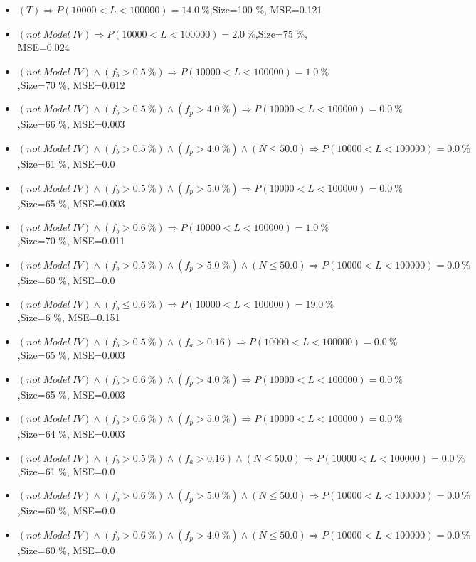\documentclass[numbered]{CSL}
\begin{document}
\begin{itemize}
\item $(T) \Rightarrow P(10 000 < L < 100 000) = 14.0~\%$,\hfill Size=100 \%, MSE=0.121
\item $(not~Model~IV) \Rightarrow P(10 000 < L < 100 000) = 2.0~\%$,\hfill Size=75 \%, MSE=0.024
\item $(not~Model~IV) \land (f_b > 0.5~\%) \Rightarrow P(10 000 < L < 100 000) = 1.0~\%$,\hfill Size=70 \%, MSE=0.012
\item $(not~Model~IV) \land (f_b > 0.5~\%) \land (f_p > 4.0~\%) \Rightarrow P(10 000 < L < 100 000) = 0.0~\%$,\hfill Size=66 \%, MSE=0.003
\item $(not~Model~IV) \land (f_b > 0.5~\%) \land (f_p > 4.0~\%) \land (N \leq 50.0) \Rightarrow P(10 000 < L < 100 000) = 0.0~\%$,\hfill Size=61 \%, MSE=0.0
\item $(not~Model~IV) \land (f_b > 0.5~\%) \land (f_p > 5.0~\%) \Rightarrow P(10 000 < L < 100 000) = 0.0~\%$,\hfill Size=65 \%, MSE=0.003
\item $(not~Model~IV) \land (f_b > 0.6~\%) \Rightarrow P(10 000 < L < 100 000) = 1.0~\%$,\hfill Size=70 \%, MSE=0.011
\item $(not~Model~IV) \land (f_b > 0.5~\%) \land (f_p > 5.0~\%) \land (N \leq 50.0) \Rightarrow P(10 000 < L < 100 000) = 0.0~\%$,\hfill Size=60 \%, MSE=0.0
\item $(not~Model~IV) \land (f_b \leq 0.6~\%) \Rightarrow P(10 000 < L < 100 000) = 19.0~\%$,\hfill Size=6 \%, MSE=0.151
\item $(not~Model~IV) \land (f_b > 0.5~\%) \land (f_a > 0.16) \Rightarrow P(10 000 < L < 100 000) = 0.0~\%$,\hfill Size=65 \%, MSE=0.003
\item $(not~Model~IV) \land (f_b > 0.6~\%) \land (f_p > 4.0~\%) \Rightarrow P(10 000 < L < 100 000) = 0.0~\%$,\hfill Size=65 \%, MSE=0.003
\item $(not~Model~IV) \land (f_b > 0.6~\%) \land (f_p > 5.0~\%) \Rightarrow P(10 000 < L < 100 000) = 0.0~\%$,\hfill Size=64 \%, MSE=0.003
\item $(not~Model~IV) \land (f_b > 0.5~\%) \land (f_a > 0.16) \land (N \leq 50.0) \Rightarrow P(10 000 < L < 100 000) = 0.0~\%$,\hfill Size=61 \%, MSE=0.0
\item $(not~Model~IV) \land (f_b > 0.6~\%) \land (f_p > 5.0~\%) \land (N \leq 50.0) \Rightarrow P(10 000 < L < 100 000) = 0.0~\%$,\hfill Size=60 \%, MSE=0.0
\item $(not~Model~IV) \land (f_b > 0.6~\%) \land (f_p > 4.0~\%) \land (N \leq 50.0) \Rightarrow P(10 000 < L < 100 000) = 0.0~\%$,\hfill Size=60 \%, MSE=0.0

\end{itemize}
\end{document}
